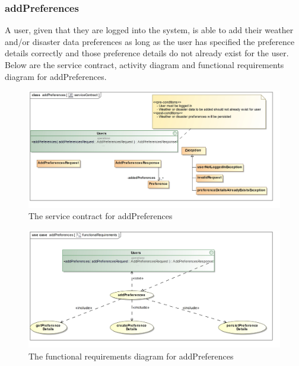 \subsubsection{addPreferences}

A user, given that they are logged into the system, is able to add their weather and/or disaster data preferences as long as the user has specified the preference details correctly and those preference details do not already exist for the user. Below are the service contract, activity diagram and functional requirements diagram for addPreferences.

\begin{figure}[H]
	\centering
	\includegraphics[scale=0.2]{../images/funcReq/addPreferencesServiceContract.jpg}
	\caption{The service contract for addPreferences \label{overflow}}
\end{figure}

\begin{figure}[H]
	\centering
	\includegraphics[scale=0.25]{../images/funcReq/addPreferencesFunctionalRequirements.jpg}
	\caption{The functional requirements diagram for addPreferences \label{overflow}}
\end{figure}

